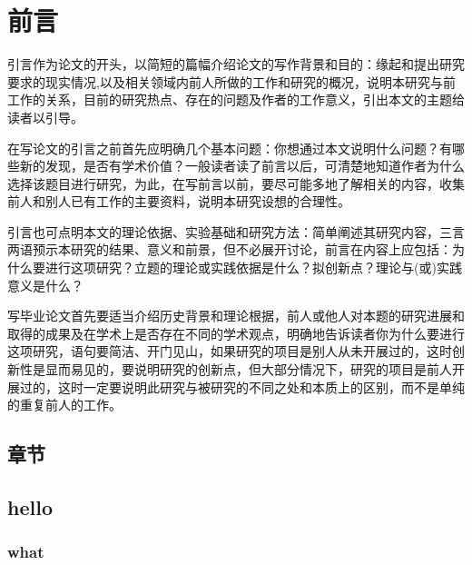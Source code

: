 \chapter{前言}\label{chap1:pre}

引言作为论文的开头，以简短的篇幅介绍论文的写作背景和目的：缘起和提出研究要求的现实情况,以及相关领域内前人所做的工作和研究的概况，说明本研究与前工作的关系，目前的研究热点、存在的问题及作者的工作意义，引出本文的主题给读者以引导。

在写论文的引言之前首先应明确几个基本问题：你想通过本文说明什么问题？有哪些新的发现，是否有学术价值？一般读者读了前言以后，可清楚地知道作者为什么选择该题目进行研究，为此，在写前言以前，要尽可能多地了解相关的内容，收集前人和别人已有工作的主要资料，说明本研究设想的合理性。

引言也可点明本文的理论依据、实验基础和研究方法：简单阐述其研究内容，三言两语预示本研究的结果、意义和前景，但不必展开讨论，前言在内容上应包括：为什么要进行这项研究？立题的理论或实践依据是什么？拟创新点？理论与(或)实践意义是什么？

写毕业论文首先要适当介绍历史背景和理论根据，前人或他人对本题的研究进展和取得的成果及在学术上是否存在不同的学术观点，明确地告诉读者你为什么要进行这项研究，语句要简洁、开门见山，如果研究的项目是别人从未开展过的，这时创新性是显而易见的，要说明研究的创新点，但大部分情况下，研究的项目是前人开展过的，这时一定要说明此研究与被研究的不同之处和本质上的区别，而不是单纯的重复前人的工作。

\section{章节}


\section{hello}\label{sec:is}
\lipsum[100-110]


\subsection{what}
\lipsum[110-112]
